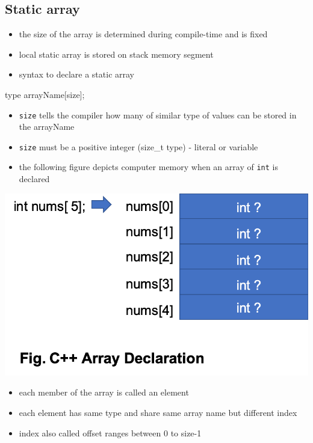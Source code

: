 \documentclass[11pt]{article}
\providecommand{\tightlist}{%
      \setlength{\itemsep}{0pt}\setlength{\parskip}{0pt}}
\newenvironment{Shaded}{}{}
\newcommand{\NormalTok}[1]{{#1}}
\newcommand{\OperatorTok}[1]{\textcolor[rgb]{0.40,0.40,0.40}{{#1}}}
\begin{document}
\hypertarget{static-array}{%
\subsection{Static array}\label{static-array}}

\begin{itemize}
\tightlist
\item
  the size of the array is determined during compile-time and is fixed
\item
  local static array is stored on stack memory segment
\item
  syntax to declare a static array
\end{itemize}

\begin{Shaded}
\begin{Highlighting}[]
\NormalTok{type arrayName}\OperatorTok{[}\NormalTok{size}\OperatorTok{];}
\end{Highlighting}
\end{Shaded}

\begin{itemize}
\tightlist
\item
  \texttt{size} tells the compiler how many of similar type of values
  can be stored in the arrayName
\item
  \texttt{size} must be a positive integer (size\_t type) - literal or
  variable
\item
  the following figure depicts computer memory when an array of
  \texttt{int} is declared
\end{itemize}

\includegraphics{resources/array.png}

\begin{itemize}
\tightlist
\item
  each member of the array is called an element
\item
  each element has same type and share same array name but different
  index
\item
  index also called offset ranges between 0 to size-1
\end{itemize}
\end{document}
